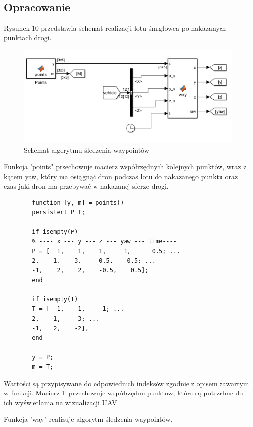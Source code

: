 \documentclass[polish,11pt,a4paper]{article}
\begin{document}
\subsection*{Opracowanie}
Rysunek 10 przedstawia schemat realizacji lotu śmigłowca po nakazanych punktach drogi.

\begin{figure}[H]
	\centering
	\includegraphics[width=1\linewidth]{nakazane/nakaz-sch.png}
	\caption{Schemat algorytmu śledzenia waypointów}
\end{figure}

Funkcja "points" przechowuje macierz współrzędnych kolejnych punktów, wraz z kątem yaw, który 
ma osiągnąć dron podczas lotu do nakazanego punktu oraz czas jaki dron ma przebywać w nakazanej sferze
drogi. 

\begin{footnotesize}
	\begin{verbatim}
		function [y, m] = points()
		persistent P T;
		
		if isempty(P)
		% ---- x --- y --- z --- yaw --- time----
		P = [  1,    1,    1,     1,      0.5; ...
		2,    1,    3,     0.5,    0.5; ...
		-1,    2,    2,    -0.5,    0.5];
		end
		
		if isempty(T)
		T = [  1,    1,    -1; ...
		2,    1,    -3; ...
		-1,   2,    -2];
		end
		
		y = P;
		m = T;
	\end{verbatim}
\end{footnotesize}


Wartości są przypisywane do odpowiednich indeksów zgodnie z opisem zawartym w funkcji. Macierz T
przechowuje współrzędne punktow, które są potrzebne do ich wyświetlania na wizualizacji UAV. 

Funkcja "way" realizuje algorytm śledzenia waypointów.
\end{document}
